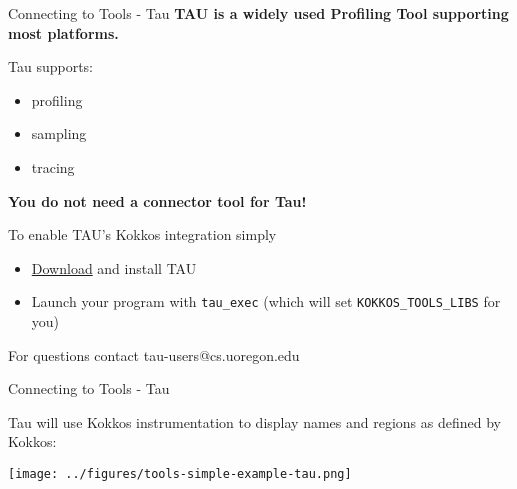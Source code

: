 \begin{frame}[fragile]{Connecting to Tools - Tau}
\textbf{TAU is a widely used Profiling Tool supporting most platforms.}

\vspace{5pt}
Tau supports:
\begin{itemize}
  \item profiling
  \item sampling
  \item tracing
\end{itemize}

\textbf{You do not need a connector tool for Tau!}

\vspace{5pt}
To enable TAU's Kokkos integration simply
\begin{itemize}
  \item \href{https://www.cs.uoregon.edu/research/tau/downloads.php}{Download} and install TAU
  \item Launch your program with \texttt{tau\_exec} (which will set \texttt{KOKKOS\_TOOLS\_LIBS} for you)
\end{itemize}

For questions contact tau-users@cs.uoregon.edu

\end{frame}


\begin{frame}[fragile]{Connecting to Tools - Tau}

Tau will use Kokkos instrumentation to display names and regions as defined by Kokkos:

	\vspace{10pt}
\texttt{[image: ../figures/tools-simple-example-tau.png]}
\end{frame}

